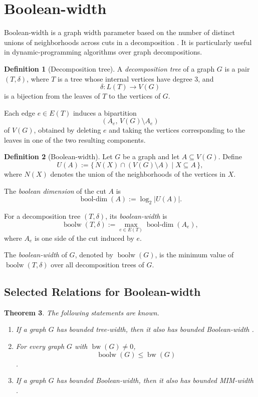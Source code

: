 \documentclass[10pt]{book}
\newtheorem{theorem}{Theorem}[section]
\theoremstyle{definition}
\newtheorem{definition}[theorem]{Definition}
\begin{document}
\section{Boolean-width}

Boolean-width is a graph width parameter based on the number of distinct unions of neighborhoods across cuts in a decomposition \cite{35}.  
It is particularly useful in dynamic-programming algorithms over graph decompositions.

\begin{definition}[Decomposition tree]
\cite{35}
A \emph{decomposition tree} of a graph \(G\) is a pair \((T,\delta)\), where \(T\) is a tree whose internal vertices have degree \(3\), and
\[
\delta: L(T)\to V(G)
\]
is a bijection from the leaves of \(T\) to the vertices of \(G\).

Each edge \(e\in E(T)\) induces a bipartition
\[
(A_e,\, V(G)\setminus A_e)
\]
of \(V(G)\), obtained by deleting \(e\) and taking the vertices corresponding to the leaves in one of the two resulting components.
\end{definition}

\begin{definition}[Boolean-width]
\cite{35}
Let \(G\) be a graph and let \(A\subseteq V(G)\).  
Define
\[
U(A):=\{\,N(X)\cap (V(G)\setminus A)\mid X\subseteq A\,\},
\]
where \(N(X)\) denotes the union of the neighborhoods of the vertices in \(X\).

The \emph{boolean dimension} of the cut \(A\) is
\[
\operatorname{bool\mbox{-}dim}(A):=\log_2 |U(A)|.
\]

For a decomposition tree \((T,\delta)\), its \emph{boolean-width} is
\[
\operatorname{boolw}(T,\delta):=\max_{e\in E(T)} \operatorname{bool\mbox{-}dim}(A_e),
\]
where \(A_e\) is one side of the cut induced by \(e\).

The \emph{boolean-width} of \(G\), denoted by \(\operatorname{boolw}(G)\), is the minimum value of
\(\operatorname{boolw}(T,\delta)\) over all decomposition trees of \(G\).
\end{definition}

\subsection{Selected Relations for Boolean-width}

\begin{theorem}
The following statements are known.
\begin{enumerate}
    \item If a graph \(G\) has bounded tree-width, then it also has bounded Boolean-width \cite{31,32}.

    \item For every graph \(G\) with \(\operatorname{bw}(G)\neq 0\),
    \[
    \operatorname{boolw}(G)\leq \operatorname{bw}(G)
    \]
        \cite{313}.

    \item If a graph \(G\) has bounded Boolean-width, then it also has bounded MIM-width \cite{31,32}.
\end{enumerate}
\end{theorem}
\end{document}
